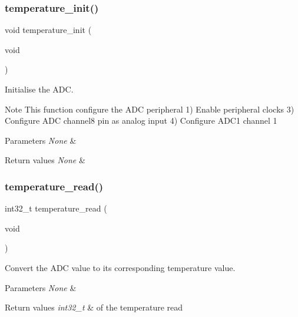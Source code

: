 \subsubsection{\texorpdfstring{temperature\+\_\+init()}{temperature\_init()}}
{\footnotesize\ttfamily void temperature\+\_\+init (\begin{DoxyParamCaption}\item[{void}]{ }\end{DoxyParamCaption})}



Initialise the A\+DC. 

\begin{DoxyNote}{Note}
This function configure the A\+DC peripheral 1) Enable peripheral clocks 3) Configure A\+DC channel8 pin as analog input 4) Configure A\+D\+C1 channel 1 
\end{DoxyNote}

\begin{DoxyParams}{Parameters}
{\em None} & \\
\hline
\end{DoxyParams}

\begin{DoxyRetVals}{Return values}
{\em None} & \\
\hline
\end{DoxyRetVals}
\mbox{\label{group___temperature_gad2e261b9f6af30d5857f1e2a892a9592}} 
\subsubsection{\texorpdfstring{temperature\+\_\+read()}{temperature\_read()}}
{\footnotesize\ttfamily int32\+\_\+t temperature\+\_\+read (\begin{DoxyParamCaption}\item[{void}]{ }\end{DoxyParamCaption})}



Convert the A\+DC value to its corresponding temperature value. 


\begin{DoxyParams}{Parameters}
{\em None} & \\
\hline
\end{DoxyParams}

\begin{DoxyRetVals}{Return values}
{\em int32\+\_\+t} & of the temperature read \\
\hline
\end{DoxyRetVals}
\mbox{\label{group___temperature_ga74915aedf88ee7840a64ab372d768ca1}} 
